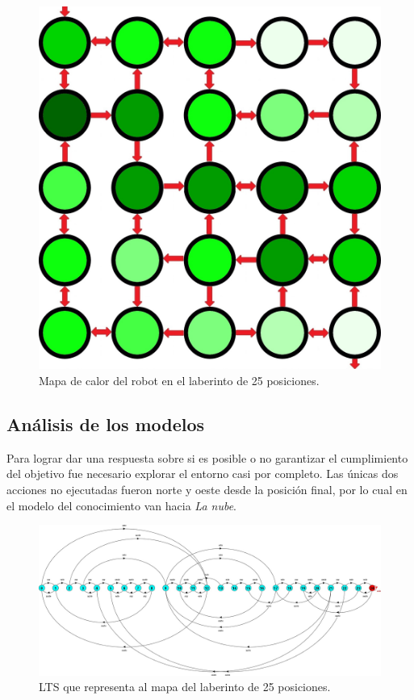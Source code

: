 \begin{figure}[H]
	\centering
		\includegraphics[width=1.0\textwidth]{Imagenes/Laberintos/25_calor.jpg}
	\caption{Mapa de calor del robot en el laberinto de 25 posiciones.}
	\label{fig:25_calor}
\end{figure}

\clearpage

\subsection{Análisis de los modelos}

Para lograr dar una respuesta sobre si es posible o no garantizar el cumplimiento del objetivo fue necesario 
explorar el entorno casi por completo. Las únicas dos acciones no ejecutadas fueron norte y oeste desde la posición 
final, por lo cual en el modelo del conocimiento van hacia \textit{La nube}.

\begin{figure}[H]
	\centering
		\includegraphics[width=1.0\textwidth]{Imagenes/Laberintos/25_view.jpg}
	\caption{LTS que representa al mapa del laberinto de 25 posiciones.}
	\label{fig:25_view}
\end{figure}

